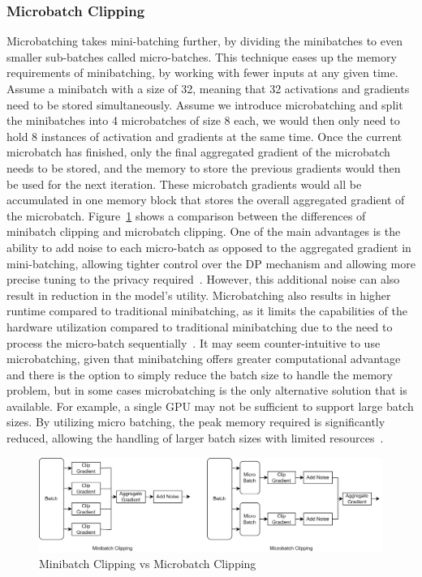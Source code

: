 \subsubsection{Microbatch Clipping}
Microbatching takes mini-batching further, by dividing the minibatches to even smaller sub-batches called micro-batches. This technique eases up the memory requirements of minibatching, by working with fewer inputs at any given time. Assume a minibatch with a size of 32, meaning that 32 activations and gradients need to be stored simultaneously. Assume we introduce microbatching and split the minibatches into 4 microbatches of size 8 each, we would then only need to hold 8 instances of activation and gradients at the same time. Once the current microbatch has finished, only the final aggregated gradient of the microbatch needs to be stored, and the memory to store the previous gradients would then be used for the next iteration. These microbatch gradients would all be accumulated in one memory block that stores the overall aggregated gradient of the microbatch. Figure~\ref{minibatchvsmicrobatch} shows a comparison between the differences of minibatch clipping and microbatch clipping. One of the main advantages is the ability to add noise to each micro-batch as opposed to the aggregated gradient in mini-batching, allowing tighter control over the DP mechanism and allowing more precise tuning to the privacy required~\cite{RefWorks:RefID:46-ponomareva2023dp-fy}. However, this additional noise can also result in reduction in the model's utility. Microbatching also results in higher runtime compared to traditional minibatching, as it limits the capabilities of the hardware utilization compared to traditional minibatching due to the need to process the micro-batch sequentially~\cite{RefWorks:RefID:51-yousefpouropacus:}. It may seem counter-intuitive to use microbatching, given that minibatching offers greater computational advantage and there is the option to simply reduce the batch size to handle the memory problem, but in some cases microbatching is the only alternative solution that is available. For example, a single GPU may not be sufficient to support large batch sizes. By utilizing micro batching, the peak memory required is significantly reduced, allowing the handling of larger batch sizes with limited resources~\cite{databricksFarewellCUDA}.
\begin{figure}[h]
\centering
        \includegraphics[width=1\linewidth]{submissions/submission5/figs/mini vs micro.png}

   
   \caption{Minibatch Clipping vs Microbatch Clipping}\label{FigDiff}
   \label{minibatchvsmicrobatch}
\end{figure} 

